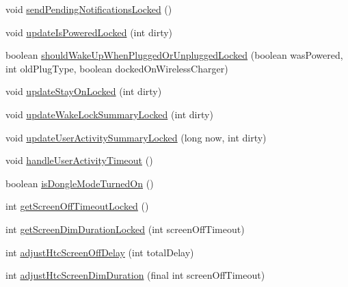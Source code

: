 \begin{DoxyCompactItemize}
\item 
void \hyperlink{classcom_1_1android_1_1server_1_1power_1_1PowerManagerService_a2237c43016fe6e761e0ac2136d3e8976}{send\-Pending\-Notifications\-Locked} ()
\item 
void \hyperlink{classcom_1_1android_1_1server_1_1power_1_1PowerManagerService_a4b7d1527af4b81e1900109374a8e1051}{update\-Is\-Powered\-Locked} (int dirty)
\item 
boolean \hyperlink{classcom_1_1android_1_1server_1_1power_1_1PowerManagerService_acf3d33e60853d31a9ea034411e935bb2}{should\-Wake\-Up\-When\-Plugged\-Or\-Unplugged\-Locked} (boolean was\-Powered, int old\-Plug\-Type, boolean docked\-On\-Wireless\-Charger)
\item 
void \hyperlink{classcom_1_1android_1_1server_1_1power_1_1PowerManagerService_aaa3b1a2cd86bb4712f6268eb071ffc68}{update\-Stay\-On\-Locked} (int dirty)
\item 
void \hyperlink{classcom_1_1android_1_1server_1_1power_1_1PowerManagerService_a6b14bbbd97e854406ecc80692323b6c0}{update\-Wake\-Lock\-Summary\-Locked} (int dirty)
\item 
void \hyperlink{classcom_1_1android_1_1server_1_1power_1_1PowerManagerService_a65851f7656ef31149cf6526f0e0ad8b8}{update\-User\-Activity\-Summary\-Locked} (long now, int dirty)
\item 
void \hyperlink{classcom_1_1android_1_1server_1_1power_1_1PowerManagerService_ab4016c8cacfa518076dff189b9004cd0}{handle\-User\-Activity\-Timeout} ()
\item 
boolean \hyperlink{classcom_1_1android_1_1server_1_1power_1_1PowerManagerService_aaab59c6a09b50f25c3a26fa17c1f238a}{is\-Dongle\-Mode\-Turned\-On} ()
\item 
int \hyperlink{classcom_1_1android_1_1server_1_1power_1_1PowerManagerService_a944ee9e7d3d9808b2f65ea57b5e0a287}{get\-Screen\-Off\-Timeout\-Locked} ()
\item 
int \hyperlink{classcom_1_1android_1_1server_1_1power_1_1PowerManagerService_ad35714067b7f29786db9f25e6b897b29}{get\-Screen\-Dim\-Duration\-Locked} (int screen\-Off\-Timeout)
\item 
int \hyperlink{classcom_1_1android_1_1server_1_1power_1_1PowerManagerService_a6b6d93b9189fc73e7e1e3fd8e71238b6}{adjust\-Htc\-Screen\-Off\-Delay} (int total\-Delay)
\item 
int \hyperlink{classcom_1_1android_1_1server_1_1power_1_1PowerManagerService_a37c5f253d91125be9c855be7a777950f}{adjust\-Htc\-Screen\-Dim\-Duration} (final int screen\-Off\-Timeout)
\item 

\end{DoxyCompactItemize}
